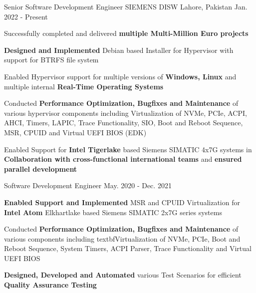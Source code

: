 

\begin{cventries}

  \cventry
    {Senior Software Development Engineer} %
    {SIEMENS DISW} %
    {Lahore, Pakistan} %
    {Jan. 2022 - Present} %
    {
      \begin{cvitems} %
        \item Successfully completed and delivered \textbf{multiple Multi-Million Euro projects}
        \item \textbf{Designed and Implemented} Debian based Installer for Hypervisor with support for BTRFS file system
        \item Enabled Hypervisor support for multiple versions of \textbf{Windows, Linux} and multiple internal \textbf{Real-Time Operating Systems}
        \item Conducted \textbf{Performance Optimization, Bugfixes and Maintenance} of various hypervisor components including Virtualization of NVMe, PCIe, ACPI, AHCI, Timers, LAPIC, Trace Functionality, SIO, Boot and Reboot Sequence, MSR, CPUID and Virtual UEFI BIOS (EDK)
        \item Enabled Support for \textbf{Intel Tigerlake} based Siemens SIMATIC 4x7G systems in \textbf{Collaboration with cross-functional international teams} and \textbf{ensured parallel development}
      \end{cvitems}
    }

  \cventry
    {Software Development Engineer} %
    {} %
    {} %
    {May. 2020 - Dec. 2021} %
    {
      \begin{cvitems} %
        \item \textbf{Enabled Support and Implemented} MSR and CPUID Virtualization for \textbf{Intel Atom} Elkhartlake based Siemens SIMATIC 2x7G series systems
        \item Conducted \textbf{Performance Optimization, Bugfixes and Maintenance} of various components including textbf{Virtualization} of NVMe, PCIe, Boot and Reboot Sequence, System Timers, ACPI Parser, Trace Functionality and Virtual UEFI BIOS
        \item \textbf{Designed, Developed and Automated} various Test Scenarios for efficient \textbf{Quality Assurance Testing}
      \end{cvitems}
    }


\end{cventries}
